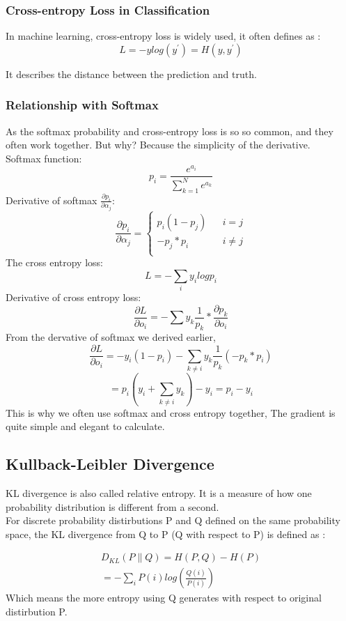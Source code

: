 \documentclass{article}
\begin{document}
\subsubsection{Cross-entropy Loss in Classification}
In machine learning, cross-entropy loss is widely used, it often defines as : 
$$L=-ylog(y^{'})=H(y,y^{'})$$

It describes the distance between the prediction and truth.
\subsubsection{Relationship with Softmax}
As the softmax probability and cross-entropy loss is so so common, and they often work together. But why? Because the simplicity of the derivative. \\
Softmax function:
$$p_{i}=\frac{e^{a_{i}}}{\sum_{k=1}^{N}e^{a_{k}}}$$
Derivative of softmax $\frac{\partial p_{i}}{\partial \alpha_{j}}$: \\
\begin{equation}
\nonumber
\frac{\partial p_{i}}{\partial \alpha_{j}}=\left\{
\begin{aligned}
p_{i}(1-p_{j}) & & i=j \\
-p_{j}*p_{i}  && i\neq j \\
\end{aligned}
\right.
\end{equation}
The cross entropy loss:
$$L=-\sum_{i}y_{i}logp_{i}$$
Derivative of cross entropy loss:
$$\frac{\partial L}{\partial o_{i}}=-\sum y_{k}\frac{1}{p_{k}}*\frac{\partial p_{k}}{\partial o_{i}}$$
From the dervative of softmax we derived earlier,
$$\frac{\partial L}{\partial o_{i}}=-y_{i}(1-p_{i})-\sum_{k \neq i}y_{k}\frac{1}{p_{k}}(-p_{k}*p_{i})$$
$$=p_{i}(y_{i}+\sum _{k \neq i}y_{k})-y_{i}=p_{i}-y_{i}$$
This is why we often use softmax and cross entropy together, The gradient is quite simple and elegant to calculate. 
\subsection{Kullback-Leibler Divergence}
KL divergence is also called relative entropy. It is a measure of how one probability distribution is different from a second.\\
For discrete probability distirbutions P and Q defined on the same probability space, the KL divergence from Q to P (Q with respect to P) is defined as :

\begin{align*}
D_{KL}(P \parallel Q)=H(P,Q)-H(P) \\
=-\sum_{i}P(i)log(\frac{Q(i)}{P(i)})
\end{align*}
Which means the more entropy using Q generates with respect to original distirbution P.
\end{document}
